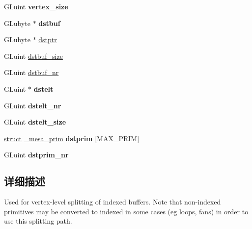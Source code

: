 \begin{DoxyCompactItemize}
\begin{tabbing}
\end{tabbing}\item 
\mbox{\label{structcopy__context_a7ac553b74a8f4a3bab361aecf850beb9}} 
G\+Luint {\bfseries vertex\+\_\+size}
\item 
\mbox{\label{structcopy__context_a6d8d590305623767ec8d726bb5bc491f}} 
G\+Lubyte $\ast$ {\bfseries dstbuf}
\item 
G\+Lubyte $\ast$ \hyperlink{structcopy__context_a089586b7ecf3cbc8aeb3e4bb422c562c}{dstptr}
\item 
G\+Luint \hyperlink{structcopy__context_a2e800ea59d50774cd970e518a044bf25}{dstbuf\+\_\+size}
\item 
G\+Luint \hyperlink{structcopy__context_aaca1d9264be422e6efb212974a9091ae}{dstbuf\+\_\+nr}
\item 
\mbox{\label{structcopy__context_a97dce78d5ece9033a339f73b92680eff}} 
G\+Luint $\ast$ {\bfseries dstelt}
\item 
\mbox{\label{structcopy__context_a2a7f2ad4b9c03dce2df3bec21ce8be63}} 
G\+Luint {\bfseries dstelt\+\_\+nr}
\item 
\mbox{\label{structcopy__context_ac475afba1451bc1d5c94fbe08be73a26}} 
G\+Luint {\bfseries dstelt\+\_\+size}
\item 
\mbox{\label{structcopy__context_aeb9ac097224342bfbad22afb64d06a40}} 
\hyperlink{interfacestruct}{struct} \hyperlink{struct__mesa__prim}{\+\_\+mesa\+\_\+prim} {\bfseries dstprim} \mbox{[}M\+A\+X\+\_\+\+P\+R\+IM\mbox{]}
\item 
\mbox{\label{structcopy__context_a24d38d64ac38cd01849ad6548dd1a345}} 
G\+Luint {\bfseries dstprim\+\_\+nr}
\end{DoxyCompactItemize}


\subsection{详细描述}
Used for vertex-\/level splitting of indexed buffers. Note that non-\/indexed primitives may be converted to indexed in some cases (eg loops, fans) in order to use this splitting path. 

